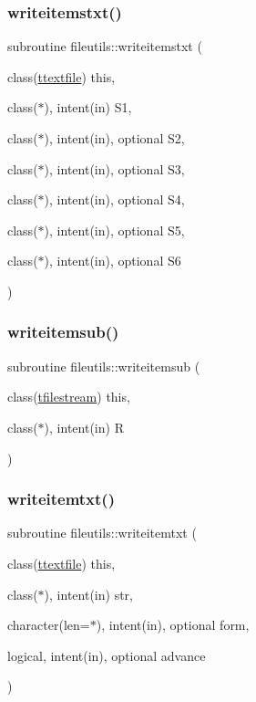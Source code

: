 \subsubsection{\texorpdfstring{writeitemstxt()}{writeitemstxt()}}
{\footnotesize\ttfamily subroutine fileutils\+::writeitemstxt (\begin{DoxyParamCaption}\item[{class(\mbox{\hyperlink{structfileutils_1_1ttextfile}{ttextfile}})}]{this,  }\item[{class($\ast$), intent(in)}]{S1,  }\item[{class($\ast$), intent(in), optional}]{S2,  }\item[{class($\ast$), intent(in), optional}]{S3,  }\item[{class($\ast$), intent(in), optional}]{S4,  }\item[{class($\ast$), intent(in), optional}]{S5,  }\item[{class($\ast$), intent(in), optional}]{S6 }\end{DoxyParamCaption})\hspace{0.3cm}{\ttfamily [private]}}

\mbox{\label{namespacefileutils_a57cd0a2cbc7978f19baaebb111cdbe1d}} 
\subsubsection{\texorpdfstring{writeitemsub()}{writeitemsub()}}
{\footnotesize\ttfamily subroutine fileutils\+::writeitemsub (\begin{DoxyParamCaption}\item[{class(\mbox{\hyperlink{structfileutils_1_1tfilestream}{tfilestream}})}]{this,  }\item[{class($\ast$), intent(in)}]{R }\end{DoxyParamCaption})\hspace{0.3cm}{\ttfamily [private]}}

\mbox{\label{namespacefileutils_ab3c52d3927403448ae70cbb4596db4af}} 
\subsubsection{\texorpdfstring{writeitemtxt()}{writeitemtxt()}}
{\footnotesize\ttfamily subroutine fileutils\+::writeitemtxt (\begin{DoxyParamCaption}\item[{class(\mbox{\hyperlink{structfileutils_1_1ttextfile}{ttextfile}})}]{this,  }\item[{class($\ast$), intent(in)}]{str,  }\item[{character(len=$\ast$), intent(in), optional}]{form,  }\item[{logical, intent(in), optional}]{advance }\end{DoxyParamCaption})\hspace{0.3cm}{\ttfamily [private]}}

